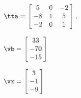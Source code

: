 {$\tta = \left[\hskip -3pt \begin{array}{ccc} 5&0&-2\\  -8&1&5
\\  -2&0&1\end{array}\hskip -3pt \right] ,$

$\vb = \left[\hskip -3pt \begin{array}{c} 33\\  -70
\\  -15\end{array}\hskip -3pt \right]$ 
}
{$\vx = \left[\hskip -3pt \begin{array}{c} 3\\  -1\\  -
9\end{array}\hskip -3pt \right]$}
